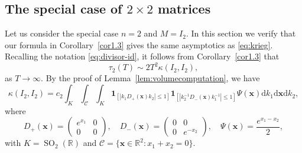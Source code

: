 \documentclass[11pt,reqno]{amsart}
\theoremstyle{definition}
\theoremstyle{remark}
\newcommand{\SO}{\operatorname{SO}}
\numberwithin{equation}{section}
\numberwithin{thm}{section}
\numberwithin{table}{section}
\def \R {{\mathbb R}}
\newcommand{\x}{\mathbf{x}}
\begin{document}
\subsection{The special case of $2\times 2$ matrices}\label{2x2}

    Let us consider the special case $n =2$ and $M = I_2$. In this section we verify that our formula in 
    Corollary~\ref{cor1.3} gives the same asymptotics  as \eqref{eq:krieg}.
Recalling the notation 
\eqref{eq:divisor-id},
it follows from Corollary~\ref{cor1.3}  that 
    \[
    \tau_2(T) 
 \sim 2 T^{2} \kappa(I_2, I_2),
    \]
    as $T \to \infty$. By the proof of Lemma~\ref{lem:volumecomputation}, we have  
    \[
    \kappa(I_2, I_2) = c_2 \int_{K} \int_{\mathcal{C}} \int_{K}  
      \mathbf{1}_{[| k_1 D_+(\mathbf{x}) k_2|\le 1]}
        \mathbf{1}_{[|  k_2^{-1} D_-(\mathbf{x}) k_1^{-1} |\le 1]}
      \Psi(\x) \mathrm{d} k_1
      \mathrm{d} \mathbf{x}
      \mathrm{d} k_2,
    \]
    where 
    \[
    D_+(\x) = \begin{pmatrix}
        e^{x_1} & 0 \\
        0 & 0
    \end{pmatrix}, \quad  
    D_-(\x) = \begin{pmatrix}
        0 & 0 \\
        0 & e^{-x_2}
    \end{pmatrix}, \quad \Psi(\x) = \frac{e^{x_1 - x_2}}{2},
    \]
with   $K = \SO_2(\R)$  and 
    $
    \mathcal{C} = \{ 
    \x \in \R^2:  x_1 + x_2 = 0
    \}.
    $
\end{document}
